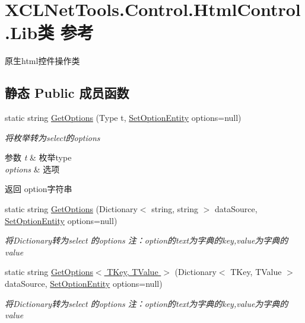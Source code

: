 \hypertarget{class_x_c_l_net_tools_1_1_control_1_1_html_control_1_1_lib}{}\section{X\+C\+L\+Net\+Tools.\+Control.\+Html\+Control.\+Lib类 参考}
\label{class_x_c_l_net_tools_1_1_control_1_1_html_control_1_1_lib}


原生html控件操作类  


\subsection*{静态 Public 成员函数}
\begin{DoxyCompactItemize}
\item 
static string \hyperlink{class_x_c_l_net_tools_1_1_control_1_1_html_control_1_1_lib_a6bc535ff27a3e67b2c4dac1d5e99aa8c}{Get\+Options} (Type t, \hyperlink{class_x_c_l_net_tools_1_1_entity_1_1_set_option_entity}{Set\+Option\+Entity} options=null)
\begin{DoxyCompactList}\small\item\em 将枚举转为select的options 
\begin{DoxyParams}{参数}
{\em t} & 枚举type\\
\hline
{\em options} & 选项\\
\hline
\end{DoxyParams}
\begin{DoxyReturn}{返回}
option字符串
\end{DoxyReturn}
\end{DoxyCompactList}\item 
static string \hyperlink{class_x_c_l_net_tools_1_1_control_1_1_html_control_1_1_lib_aea5ab0601c97a418ef6291f75aa7baff}{Get\+Options} (Dictionary$<$ string, string $>$ data\+Source, \hyperlink{class_x_c_l_net_tools_1_1_entity_1_1_set_option_entity}{Set\+Option\+Entity} options=null)
\begin{DoxyCompactList}\small\item\em 将\+Dictionary转为select 的options 注：option的text为字典的key,value为字典的value \end{DoxyCompactList}\item 
static string \hyperlink{class_x_c_l_net_tools_1_1_control_1_1_html_control_1_1_lib_a48013321b30150acdbf3fcf28955980e}{Get\+Options$<$ T\+Key, T\+Value $>$} (Dictionary$<$ T\+Key, T\+Value $>$ data\+Source, \hyperlink{class_x_c_l_net_tools_1_1_entity_1_1_set_option_entity}{Set\+Option\+Entity} options=null)
\begin{DoxyCompactList}\small\item\em 将\+Dictionary转为select 的options 注：option的text为字典的key,value为字典的value \end{DoxyCompactList}\end{DoxyCompactItemize}


